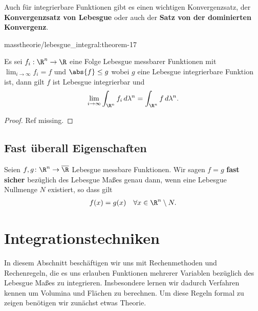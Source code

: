 \documentclass[letterpaper,10pt,german]{jupyterBook}
\begin{document}
\par
Auch für integrierbare Funktionen gibt es einen wichtigen Konvergenzsatz, der \textbf{Konvergenzsatz von Lebesgue} oder auch der \textbf{Satz von der dominierten Konvergenz}.
\begin{theorem}{}{masstheorie/lebesgue_integral:theorem-17}



\par
Es sei \(f_i:\R^n\to\R\) eine Folge Lebesgue messbarer Funktionen mit \(\lim_{i\to\infty} f_i =f\) und \(\abs{f}\leq g\) wobei \(g\) eine Lebesgue integrierbare Funktion ist, dann gilt \(f\) ist Lebesgue integrierbar und
\begin{align*}
\lim_{i\to\infty} \int_{\R^n} f_i\, d\lambda^n = \int_{\R^n} f\, d\lambda^n.
\end{align*}\end{theorem}

\begin{proof}
 Ref missing.
\end{proof}


\subsection{Fast überall Eigenschaften}
\begin{definition}{}{}\label{masstheorie/lebesgue_integral:definition-18}



\par
Seien \(f,g \colon \R^n \rightarrow \overline{\R}\) Lebesgue messbare Funktionen.
Wir sagen \(f = g\) \textbf{fast sicher} bezüglich des Lebesgue Maßes genau dann, wenn eine Lebesgue Nullmenge \(N\) existiert, so dass gilt
\begin{align*}
f(x) = g(x) \quad \forall x \in \R^n \setminus N.
\end{align*}\end{definition}


\section{Integrationstechniken}
\label{\detokenize{masstheorie/integrationstechnik:integrationstechniken}}\label{\detokenize{masstheorie/integrationstechnik::doc}}
\par
In diesem Abschnitt beschäftigen wir uns mit Rechenmethoden und Rechenregeln, die es uns erlauben Funktionen mehrerer Variablen bezüglich des Lebesgue Maßes zu integrieren. Insbesondere lernen wir dadurch Verfahren kennen um Volumina und Flächen zu berechnen. Um diese Regeln formal zu zeigen benötigen wir zunächst etwas Theorie.
\end{document}
